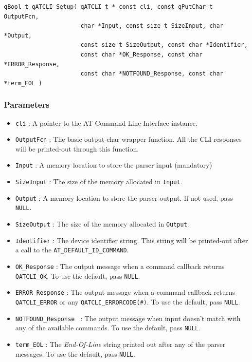 \documentclass{article}
\begin{document}
\begin{lstlisting}[style=CStyle]
qBool_t qATCLI_Setup( qATCLI_t * const cli, const qPutChar_t OutputFcn, 
                      char *Input, const size_t SizeInput, char *Output, 
                      const size_t SizeOutput, const char *Identifier, 
                      const char *OK_Response, const char *ERROR_Response, 
                      const char *NOTFOUND_Response, const char *term_EOL )
\end{lstlisting}

\subsubsection*{Parameters}
\begin{itemize}
    \item \lstinline{cli} : A pointer to the AT Command Line Interface instance. 
    \item \lstinline{OutputFcn} : The basic output-char wrapper function. All the CLI responses  will be printed-out through this function.
    \item \lstinline{Input} : A memory location to store the parser input (mandatory) 
    \item \lstinline{SizeInput} : The size of the memory allocated in \lstinline{Input}. 
    \item \lstinline{Output} : A memory location to store the parser output. If not used, pass \lstinline{NULL}.
    \item \lstinline{SizeOutput} : The size of the memory allocated in \lstinline{Output}. 
    \item \lstinline{Identifier} : The device identifier string. This string will be printed-out after a call to the \lstinline{AT_DEFAULT_ID_COMMAND}.
    \item \lstinline{OK_Response} : The output message when a command callback returns \lstinline{QATCLI_OK}. To use the default, pass \lstinline{NULL}.
    \item \lstinline{ERROR_Response} : The output message when a command callback returns \lstinline{QATCLI_ERROR} or any \lstinline{QATCLI_ERRORCODE(#)}. To use the default, pass \lstinline{NULL}.
    \item \lstinline{NOTFOUND_Response } : The output message when input doesn't match with any of  the available commands. To use the default, pass \lstinline{NULL}.
    \item \lstinline{term_EOL} : The \textit{End-Of-Line} string printed out after any of the parser messages. To use the default, pass \lstinline{NULL}. 
\end{itemize}
\end{document}
